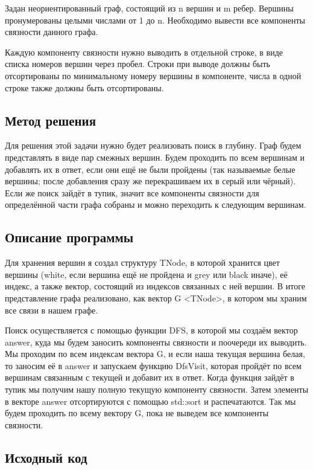 \documentclass[12pt]{article}
\begin{document}
Задан неориентированный граф, состоящий из n вершин и m ребер. Вершины пронумерованы целыми числами от 1 до n. Необходимо вывести все компоненты связности данного графа.

Каждую компоненту связности нужно выводить в отдельной строке, в виде списка номеров вершин через пробел. Строки при выводе должны быть отсортированы по минимальному номеру вершины в компоненте, числа в одной строке также должны быть отсортированы.

\subsection*{Метод решения}

Для решения этой задачи нужно будет реализовать поиск в глубину. Граф будем представлять в виде пар смежных вершин. Будем проходить по всем вершинам и добавлять их в ответ, если они ещё не были пройдены (так называемые белые вершины; после добавления сразу же перекрашиваем их в серый или чёрный). Если же поиск зайдёт в тупик, значит все компоненты связности для определённой части графа собраны и можно переходить к следующим вершинам. 

\subsection*{Описание программы}

Для хранения вершин я создал структуру TNode, в которой хранится цвет вершины (white, если вершина ещё не пройдена и grey или black иначе), её индекс, а также вектор, состоящий из индексов связанных с ней вершин. В итоге представление графа реализовано, как вектор G <TNode>, в котором мы храним все связи в нашем графе.

Поиск осуществляется с помощью функции DFS, в которой мы создаём вектор answer, куда мы будем заносить компоненты связности и поочереди их выводить. Мы проходим по всем индексам вектора G, и если наша текущая вершина белая, то заносим её в answer и запускаем функцию DfsVisit, которая пройдёт по всем вершинам связанным с текущей и добавит их в ответ. Когда функция зайдёт в тупик мы получим нашу полную текущую компоненту связности. Затем элементы в векторе answer отсортируются с помощью std::sort и распечатаются. Так мы будем проходить по всему вектору G, пока не выведем все компоненты связности.

\subsection*{Исходный код}
\end{document}
